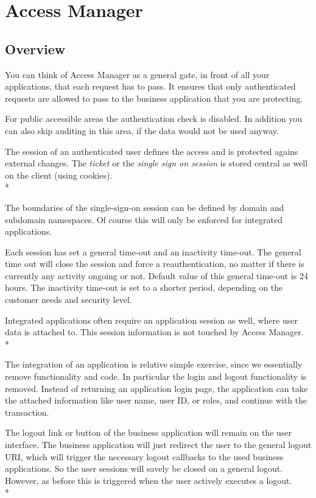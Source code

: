 
\chapter{Access Manager}

\section{Overview}

You can think of Access Manager as a general gate, in front of all your
applications, that each request has to pass. It ensures that only
authenticated requests are allowed to pass to the business application
that you are protecting.

For public accessible areas the authentication check is disabled. In
addition you can also skip auditing in this area, if the data would not
be used anyway.

The session of an authenticated user defines the access and is protected 
agains external changes. The \emph{ticket} or the \emph{single sign on 
session} is stored central as well on the client (using cookies).\\*

The boundaries of the single-sign-on session can be defined by domain
and subdomain namespaces. Of course this will only be enforced for
integrated applications.

Each session has set a general time-out and an inactivity time-out. The
general time out will close the session and force a reauthentication, no
matter if there is currently any activity ongoing or not. Default value
of this general time-out is 24 hours. The inactivity time-out is set to
a shorter period, depending on the customer needs and security level.

Integrated applications often require an application session as well,
where user data is attached to. This session information is not touched 
by Access Manager.\\*


The integration of an application is relative simple exercise, since we
essentially remove functionality and code. In particular the login and
logout functionality is removed. Instead of returning an application
login page, the application can take the attached information like user
name, user ID, or roles, and continue with the transaction.

The logout link or button of the business application will remain on the
user interface. The business application will just redirect the user to
the general logout URI, which will trigger the necessary logout
callbacks to the used business applications. So the user sessions will
savely be closed on a general logout. However, as before this is
triggered when the user actively executes a logout.\\*

